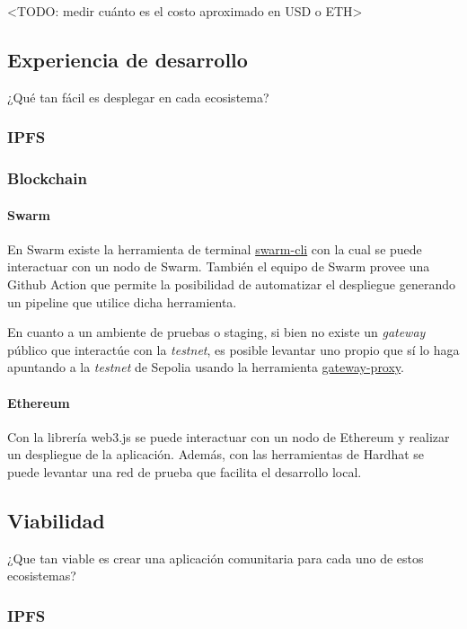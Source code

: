 <TODO: medir cuánto es el costo aproximado en USD o ETH>

\subsection{Experiencia de desarrollo} %

¿Qué tan fácil es desplegar en cada ecosistema?

\subsubsection{IPFS}

\subsubsection{Blockchain}

\paragraph{Swarm}
En Swarm existe la herramienta de terminal \href{https://github.com/ethersphere/swarm-cli}{swarm-cli} con la cual se puede interactuar con un nodo de Swarm. También el equipo de Swarm provee una Github Action que permite la posibilidad de automatizar el despliegue generando un pipeline que utilice dicha herramienta.

En cuanto a un ambiente de pruebas o staging, si bien no existe un \textit{gateway} público que interactúe con la \textit{testnet}, es posible levantar uno propio que sí lo haga apuntando a la \textit{testnet} de Sepolia usando la herramienta \href{https://github.com/ethersphere/gateway-proxy}{gateway-proxy}.

\paragraph{Ethereum}
Con la librería web3.js se puede interactuar con un nodo de Ethereum y realizar un despliegue de la aplicación. Además, con las herramientas de Hardhat se puede levantar una red de prueba que facilita el desarrollo local.

\subsection{Viabilidad} 

¿Que tan viable es crear una aplicación comunitaria para cada uno de estos ecosistemas?

\subsubsection{IPFS}

